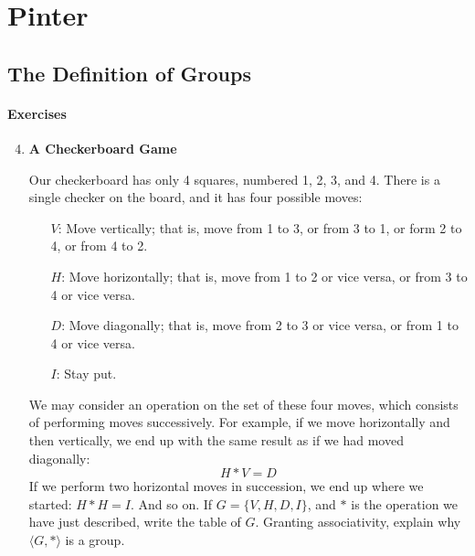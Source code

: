 \documentclass[../notes.tex]{subfiles}
\begin{document}
\part{Pinter}
\setcounter{chapter}{2}
\chapter{The Definition of Groups}
\subsection*{Exercises}
\begin{enumerate}[label={\textbf{\Alph*.}}]
    \setcounter{enumi}{3}
    \item \textbf{A Checkerboard Game}
    \begin{center}
    \end{center}
    Our checkerboard has only 4 squares, numbered 1, 2, 3, and 4. There is a single checker on the board, and it has four possible moves:
    \begin{itemize}[itemsep=0pt]
        \item[$V$:] Move vertically; that is, move from 1 to 3, or from 3 to 1, or form 2 to 4, or from 4 to 2.
        \item[$H$:] Move horizontally; that is, move from 1 to 2 or vice versa, or from 3 to 4 or vice versa.
        \item[$D$:] Move diagonally; that is, move from 2 to 3 or vice versa, or from 1 to 4 or vice versa.
        \item[$I$:] Stay put.
    \end{itemize}
    We may consider an operation on the set of these four moves, which consists of performing moves successively. For example, if we move horizontally and then vertically, we end up with the same result as if we had moved diagonally:
    \begin{equation*}
        H*V = D
    \end{equation*}
    If we perform two horizontal moves in succession, we end up where we started: $H*H=I$. And so on. If $G=\{V,H,D,I\}$, and $*$ is the operation we have just described, write the table of $G$. Granting associativity, explain why $\langle G,*\rangle$ is a group.
\end{enumerate}
\end{document}
